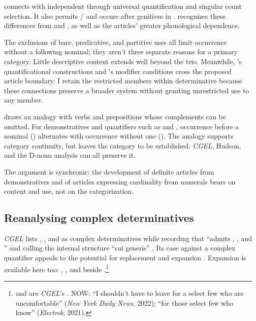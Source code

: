 \documentclass[12pt]{article}
\begin{document}
 connects with independent  through universal quantification and singular count selection. It also permits / and occurs after genitives in . \textcite[156--158]{spinillo2004reconceptualising} recognizes these differences from  and , as well as the articles' greater phonological dependence.

The exclusions of bare, predicative, and partitive uses all limit occurrence without a following nominal; they aren't three separate reasons for a primary category. Little descriptive content extends well beyond the trio. Meanwhile, 's quantificational constructions and 's modifier conditions cross the proposed article boundary. I retain the restricted members within determinative because these connections preserve a broader system without granting unrestricted use to any member.

\textcite[140--144]{spinillo2004reconceptualising} draws an analogy with verbs and prepositions whose complements can be omitted. For demonstratives and quantifiers such as  and , occurrence before a nominal () alternates with occurrence without one (). The analogy supports category continuity, but leaves the category to be established: \textit{CGEL}, Hudson, and the D-noun analysis can all preserve it.

The argument is synchronic: the development of definite articles from demonstratives and of articles expressing cardinality from numerals \citep[331--336]{lyons1999} bears on content and use, not on the categorization.

\subsection{Reanalysing complex determinatives}\label{sec:complex-determinatives}

\textit{CGEL} lists , , and  as complex determinatives while recording that  \enquote{admits , , and } and calling the internal structure \enquote{sui generis} \citep[392, 394]{huddleston2002}. Its case against a complex quantifier  appeals to the potential for replacement and expansion \citep[351--352]{huddleston2002}. Expansion is available here too: , , and  beside .\footnote{ and  are \textit{CGEL}'s \citep[392]{huddleston2002}. NOW: \enquote{I shouldn't have to leave for a select few who are uncomfortable} (\textit{New York Daily News}, 2022); \enquote{for those select few who know} (\textit{Electrek}, 2021).}
\end{document}
